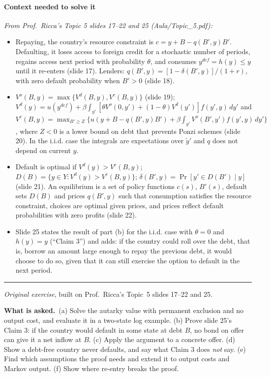 \documentclass[11pt,a4paper]{article}
\newcommand{\asked}{\par\medskip\noindent\textbf{What is asked.}~}
\providecommand{\tightlist}{\setlength{\itemsep}{0pt}\setlength{\parskip}{0pt}}
\newcommand{\stmtend}{\par\endgroup\nopagebreak\noindent\rule{\linewidth}{0.4pt}\par\medskip}
\begin{document}
\paragraph{Context needed to solve it}

\emph{From Prof.~Ricca's Topic 5 slides 17--22 and 25 (Aula/Topic\_5.pdf):}

\begin{itemize}
\tightlist
\item
  Repaying, the country's resource constraint is \(c = y + B - q(B', y)B'\). Defaulting, it loses
  access to foreign credit for a stochastic number of periods, regains access next period with
  probability \(\theta\), and consumes \(y^{def} = h(y) \le y\) until it re-enters (slide 17).
  Lenders: \(q(B', y) = [1 - \delta(B', y)]/(1 + r)\), with zero default probability when \(B' > 0\)
  (slide 18).
\item
  \(V^o(B, y) = \max\{V^d(B, y), V^c(B, y)\}\) (slide 19);
  \(V^d(y) = u(y^{def}) + \beta\int_{y'}[\theta V^o(0, y') + (1 - \theta)V^d(y')]f(y', y)\,dy'\) and
  \(V^c(B, y) = \max_{B' \ge Z}\{u(y + B - q(B', y)B') + \beta\int_{y'}V^o(B', y')f(y', y)\,dy'\}\),
  where \(Z < 0\) is a lower bound on debt that prevents Ponzi schemes (slide 20). In the i.i.d.
  case the integrals are expectations over \(\tilde y'\) and \(q\) does not depend on current \(y\).
\item
  Default is optimal if \(V^d(y) > V^c(B, y)\); \(D(B) = \{y \in Y : V^d(y) > V^c(B, y)\}\);
  \(\delta(B', y) = \Pr[y' \in D(B') \mid y]\) (slide 21). An equilibrium is a set of policy
  functions \(c(s)\), \(B'(s)\), default sets \(D(B)\) and prices \(q(B', y)\) such that consumption
  satisfies the resource constraint, choices are optimal given prices, and prices reflect default
  probabilities with zero profits (slide 22).
\item
  Slide 25 states the result of part (b) for the i.i.d. case with \(\theta = 0\) and \(h(y) = y\)
  (``Claim 3'') and adds: if the country could roll over the debt, that is, borrow an amount large
  enough to repay the previous debt, it would choose to do so, given that it can still exercise the
  option to default in the next period.
\end{itemize}
\stmtend

\noindent\emph{Original exercise}, built on Prof.\ Ricca's Topic~5 slides 17--22 and 25.

\asked (a) Solve the autarky value with permanent exclusion and no output cost, and evaluate it in a two-state log example. (b) Prove slide 25's Claim 3: if the
country would default in some state at debt $B$, no bond on offer can give it a net inflow at $B$. (c) Apply the argument to a concrete offer. (d) Show a debt-free
country never defaults, and say what Claim 3 does \emph{not} say. (e) Find which assumptions the proof needs and extend it to output costs and Markov output.
(f) Show where re-entry breaks the proof.
\end{document}
